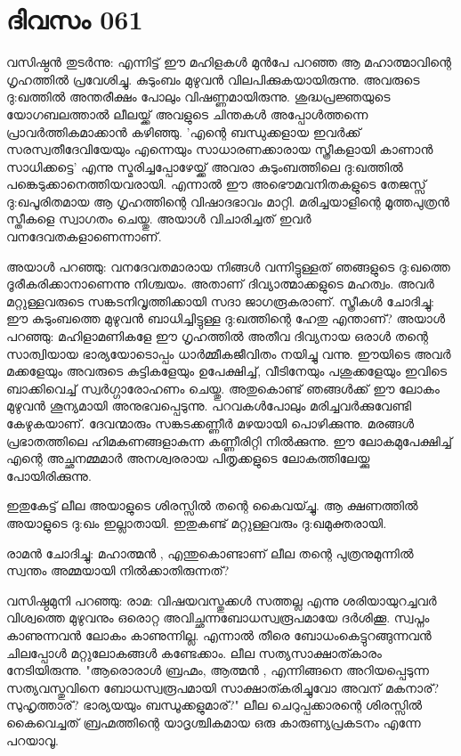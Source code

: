 
\section{ദിവസം 061}


വസിഷ്ഠന്‍ തുടര്‍ന്നു: എന്നിട്ട്‌ ഈ മഹിളകള്‍ മുന്‍പേ പറഞ്ഞ ആ മഹാത്മാവിന്റെ ഗൃഹത്തില്‍ പ്രവേശിച്ചു. കുടുംബം മുഴുവന്‍ വിലപിക്കുകയായിരുന്നു. അവരുടെ ദു:ഖത്തില്‍ അന്തരീക്ഷം പോലും വിഷണ്ണമായിരുന്നു. ശുദ്ധപ്രജ്ഞയുടെ യോഗബലത്താല്‍ ലീലയ്ക്ക്‌ അവളുടെ ചിന്തകള്‍ അപ്പോള്‍ത്തന്നെ പ്രാവര്‍ത്തികമാക്കാന്‍ കഴിഞ്ഞു. 'എന്റെ ബന്ധുക്കളായ ഇവര്‍ക്ക്‌ സരസ്വതീദേവിയേയും എന്നെയും സാധാരണക്കാരായ സ്ത്രീകളായി കാണാന്‍ സാധിക്കട്ടെ' എന്നു സ്മരിച്ചപ്പോഴേയ്ക്ക്‌ അവരാ കുടുംബത്തിലെ ദു:ഖത്തില്‍ പങ്കെടുക്കാനെത്തിയവരായി. എന്നാല്‍ ഈ അഭൌമവനിതകളുടെ തേജസ്സ്‌ ദു:ഖപൂരിതമായ ആ ഗൃഹത്തിന്റെ വിഷാദഭാവം മാറ്റി. മരിച്ചയാളിന്റെ മൂത്തപുത്രന്‍ സ്തീകളെ സ്വാഗതം ചെയ്തു. അയാള്‍ വിചാരിച്ചത്‌ ഇവര്‍ വനദേവതകളാണെന്നാണ്‌. 

അയാള്‍ പറഞ്ഞു: വനദേവതമാരായ നിങ്ങള്‍ വന്നിട്ടുള്ളത്‌ ഞങ്ങളുടെ ദു:ഖത്തെ ദൂരീകരിക്കാനാണെന്നു നിശ്ചയം. അതാണ്‌ ദിവ്യാത്മാക്കളുടെ മഹത്വം. അവര്‍ മറ്റുള്ളവരുടെ സങ്കടനിവൃത്തിക്കായി സദാ ജാഗരൂകരാണ്‌. സ്ത്രീകള്‍ ചോദിച്ചു: ഈ കുടുംബത്തെ മുഴുവന്‍ ബാധിച്ചിട്ടുള്ള ദു:ഖത്തിന്റെ ഹേതു എന്താണ്‌? അയാള്‍ പറഞ്ഞു: മഹിളാമണികളേ ഈ ഗൃഹത്തില്‍ അതീവ ദിവ്യനായ ഒരാള്‍ തന്റെ സാത്വിയായ ഭാര്യയോടൊപ്പം ധാര്‍മ്മീകജീവിതം നയിച്ചു വന്നു. ഈയിടെ അവര്‍ മക്കളേയും അവരുടെ കുട്ടികളേയും ഉപേക്ഷിച്ച്‌, വീടിനേയും പശുക്കളേയും ഇവിടെ ബാക്കിവെച്ച്‌ സ്വര്‍ഗ്ഗാരോഹണം ചെയ്തു. അതുകൊണ്ട്‌ ഞങ്ങള്‍ക്ക്‌ ഈ ലോകം മുഴുവന്‍ ശൂന്യമായി അനുഭവപ്പെടുന്നു. പറവകള്‍പോലും മരിച്ചവര്‍ക്കുവേണ്ടി കേഴുകയാണ്‌. ദേവന്മാരും സങ്കടക്കണ്ണീര്‍ മഴയായി പൊഴിക്കുന്നു. മരങ്ങള്‍ പ്രഭാതത്തിലെ ഹിമകണങ്ങളാകുന്ന കണ്ണീരിറ്റി നില്‍ക്കുന്നു. ഈ ലോകമുപേക്ഷിച്ച്‌ എന്റെ അച്ഛനമ്മമാര്‍ അനശ്വരരായ പിതൃക്കളുടെ ലോകത്തിലേയ്ക്കു പോയിരിക്കുന്നു.

ഇതുകേട്ട്‌ ലീല അയാളുടെ ശിരസ്സില്‍ തന്റെ കൈവയ്ച്ചു. ആ ക്ഷണത്തില്‍ അയാളുടെ ദു:ഖം ഇല്ലാതായി. ഇതുകണ്ട്‌ മറ്റുള്ളവരും ദു:ഖമുക്തരായി.

രാമന്‍ ചോദിച്ചു: മഹാത്മന്‍ , എന്തുകൊണ്ടാണ്‌ ലീല തന്റെ പുത്രനുമുന്നില്‍ സ്വന്തം അമ്മയായി നില്‍ക്കാതിരുന്നത്‌?

വസിഷ്ഠമുനി പറഞ്ഞു: രാമ: വിഷയവസ്തുക്കള്‍ സത്തല്ല എന്നു ശരിയായുറച്ചവര്‍ വിശ്വത്തെ മുഴുവനും ഒരൊറ്റ അവിച്ഛന്നബോധസ്വരൂപമായേ ദര്‍ശിക്കൂ. സ്വപ്നം കാണുന്നവന്‍ ലോകം കാണുന്നില്ല. എന്നാല്‍ തീരെ ബോധംകെട്ടുറങ്ങുന്നവന്‍ ചിലപ്പോള്‍ മറ്റുലോകങ്ങള്‍ കണ്ടേക്കാം. ലീല സത്യസാക്ഷാത്കാരം നേടിയിരുന്നു. "ആരൊരാള്‍ ബ്രഹ്മം, ആത്മന്‍ , എന്നിങ്ങനെ അറിയപ്പെടുന്ന സത്യവസ്തുവിനെ ബോധസ്വരൂപമായി സാക്ഷാത്കരിച്ചുവോ അവന്‌ മകനാര്‌? സുഹൃത്താര്‌? ഭാര്യയയും ബന്ധൂക്കളുമാര്‌?" ലീല ചെറുപ്പക്കാരന്റെ ശിരസ്സില്‍ കൈവെച്ചത്‌ ബ്രഹ്മത്തിന്റെ യാദൃശ്ചികമായ ഒരു കാരുണ്യപ്രകടനം എന്നേ പറയാവൂ.
